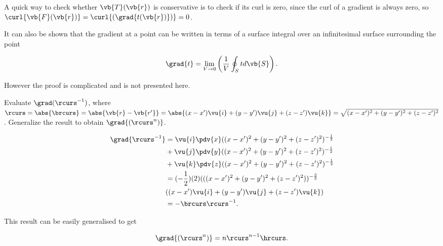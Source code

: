 \documentclass[english,a4paper,12pt]{report}
\begin{document}
A quick way to check whether \(\vb{T} (\vb{r} )\) is conservative is to check if its curl is zero, since the curl of a gradient is always zero, so \(\curl{\vb{F} (\vb{r} )} = \curl{(\grad{t(\vb{r} )} )} =0 \).  

It can also be shown that the gradient at a point can be written in terms of a surface integral over an infinitesimal surface surrounding the point

\begin{equation}
	\grad{t } = \lim_{V \to 0} \left( \frac{1}{V} \oint_{S} t  d\vb{S}  \right).
\end{equation}

However the proof is complicated and is not presented here.

{Evaluate \(\grad({\rcurs ^{-1} })\), where \(\rcurs = \abs{\brcurs} = \abs{\vb{r} - \vb{r'}} = \abs{(x - x')\vu{i} + (y - y')\vu{j} + (z - z')\vu{k}} = \sqrt{(x-x')^2+(y-y')^2+(z-z')^2}\). Generalize the result to obtain \(\grad{(\rcurs^n)}\).}
{\begin{equation} 
	\begin{aligned} 
		\grad{\rcurs ^{-1} } &= \vu{i}\pdv{x}((x - x')^2 + (y - y')^2 + (z - z')^2)^{-\frac{1}{2}} \\ &+ \vu{j}\pdv{y}((x - x')^2 + (y - y')^2 + (z - z')^2)^{-\frac{1}{2}} \\ &+ \vu{k}\pdv{z}((x - x')^2 + (y - y')^2 + (z - z')^2)^{-\frac{1}{2}} \\ &= (-\frac{1}{2})(2)(((x - x')^2 + (y - y')^2 + (z - z')^2))^{-\frac{3}{2}} \\ &((x - x')\vu{i} + (y - y')\vu{j} + (z - z')\vu{k}) \\ &=- \brcurs \rcurs ^{-1} . 
	\end{aligned} 
\end{equation}
		
This result can be easily generalised to get
		
\begin{equation} 
	\grad{(\rcurs^n)} = n\rcurs^{n-1}\hrcurs. \label{gradrcurs} 
\end{equation}}
\end{document}
